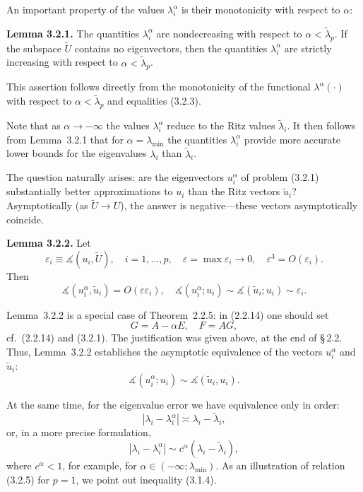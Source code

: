 \documentclass[11pt,oneside]{book}
\newcommand{\ang}{\measuredangle}
\begin{document}
An important property of the values $\lambda_i^\alpha$ is their monotonicity with respect to $\alpha$:

\textbf{Lemma 3.2.1.} The quantities $\lambda_i^\alpha$ are nondecreasing with respect to $\alpha < \tilde{\lambda}_p$. If the subspace $\widetilde{U}$ contains no eigenvectors, then the quantities $\lambda_i^\alpha$ are strictly increasing with respect to $\alpha < \tilde{\lambda}_p$.

This assertion follows directly from the monotonicity of the functional $\lambda^\alpha(\cdot)$ with respect to $\alpha < \tilde{\lambda}_p$ and equalities (3.2.3).

Note that as $\alpha \to -\infty$ the values $\lambda_i^\alpha$ reduce to the Ritz values $\tilde{\lambda}_i$. It then follows from Lemma~3.2.1 that for $\alpha = \lambda_{\min}$ the quantities $\lambda_i^\alpha$ provide more accurate lower bounds for the eigenvalues $\lambda_i$ than $\tilde{\lambda}_i$.

The question naturally arises: are the eigenvectors $u_i^\alpha$ of problem (3.2.1) substantially better approximations to $u_i$ than the Ritz vectors $\tilde{u}_i$? Asymptotically (as $\widetilde{U} \to U$), the answer is negative---these vectors asymptotically coincide.

\textbf{Lemma 3.2.2.} Let
\[
\varepsilon_i \equiv \ang(u_i, \widetilde{U}), \quad i = 1, \ldots, p, \quad \varepsilon = \max \varepsilon_i \to 0, \quad \varepsilon^3 = O(\varepsilon_i).
\]
Then
\[
\ang(u_i^\alpha, \tilde{u}_i) = O(\varepsilon\varepsilon_i), \quad \ang(u_i^\alpha; u_i) \sim \ang(\tilde{u}_i; u_i) \sim \varepsilon_i.
\]

Lemma~3.2.2 is a special case of Theorem~2.2.5: in (2.2.14) one should set
\[
G = A - \alpha E, \quad F = AG,
\]
cf.\ (2.2.14) and (3.2.1). The justification was given above, at the end of \S\,2.2. Thus, Lemma~3.2.2 establishes the asymptotic equivalence of the vectors $u_i^\alpha$ and $\tilde{u}_i$:
\[
\ang(u_i^\alpha; u_i) \sim \ang(\tilde{u}_i, u_i).
\tag{3.2.4}
\]

At the same time, for the eigenvalue error we have equivalence only in order:
\[
|\lambda_i - \lambda_i^\alpha| \asymp \lambda_i - \tilde{\lambda}_i,
\]
or, in a more precise formulation,
\[
|\lambda_i - \lambda_i^\alpha| \sim c^\alpha (\lambda_i - \tilde{\lambda}_i),
\tag{3.2.5}
\]
where $c^\alpha < 1$, for example, for $\alpha \in (-\infty; \lambda_{\min})$. As an illustration of relation (3.2.5) for $p = 1$, we point out inequality (3.1.4).
\end{document}
